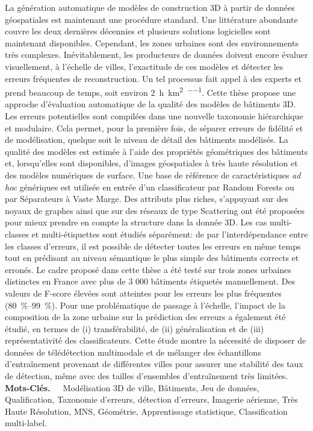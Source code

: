 La génération automatique de modèles de construction 3D à partir de données géospatiales est maintenant une procédure standard.
Une littérature abondante couvre les deux dernières décennies et plusieurs solutions logicielles sont maintenant disponibles.
Cependant, les zones urbaines sont des environnements très complexes.
Inévitablement, les producteurs de données doivent encore évaluer visuellement, à l'échelle de villes, l'exactitude de ces modèles et détecter les erreurs fréquentes de reconstruction.
Un tel processus fait appel à des experts et prend beaucoup de temps, soit environ \SI[per-mode=repeated-symbol]{2}{\hour\per\km\squared\per\expert}.
Cette thèse propose une approche d'évaluation automatique de la qualité des modèles de bâtiments 3D.
Les erreurs potentielles sont compilées dans une nouvelle taxonomie hiérarchique et modulaire.
Cela permet, pour la première fois, de séparer erreurs de fidélité et de modélisation, quelque soit le niveau de détail des bâtiments modélisés.
La qualité des modèles est estimée à l'aide des propriétés géométriques des bâtiments et, lorsqu'elles sont disponibles, d'images géospatiales à très haute résolution et des modèles numériques de surface.
Une base de référence de caractéristiques \textit{ad hoc} génériques est utilisée en entrée d'un classificateur par Random Forests ou par Séparateurs à Vaste Marge.
Des attributs plus riches, s'appuyant sur des noyaux de graphes ainsi que sur des réseaux de type Scattering ont été proposées pour mieux prendre en compte la structure dans la donnée 3D.
Les cas multi-classes et multi-étiquettes sont étudiés séparément: de par l'interdépendance entre les classes d'erreurs, il est possible de détecter toutes les erreurs en même temps tout en prédisant au niveau sémantique le plus simple des bâtiments corrects et erronés.
Le cadre proposé dans cette thèse a été testé sur trois zones urbaines distinctes en France avec plus de 3 000 bâtiments étiquetés manuellement.
Des valeurs de F-score élevées sont atteintes pour les erreurs les plus fréquentes (\SIrange[range-phrase={ -- }]{80}{99}{\percent}).
Pour une problématique de passage à l’échelle, l'impact de la composition de la zone urbaine sur la prédiction des erreurs a également été étudié, en termes de (i) transférabilité, de (ii) généralisation et de (iii) représentativité des classificateurs.
Cette étude montre la nécessité de disposer de données de télédétection multimodale et de mélanger des échantillons d'entraînement provenant de différentes villes pour assurer une stabilité des taux de détection, même avec des tailles d'ensembles d'entraînement très limitées.\\

\textbf{Mots-Clés.}~~~Modélisation 3D de ville, Bâtiments, Jeu de données, Qualification, Taxonomie d'erreurs, détection d'erreurs, Imagerie aérienne, Très Haute Résolution, MNS, Géométrie, Apprentissage statistique, Classification multi-label.
